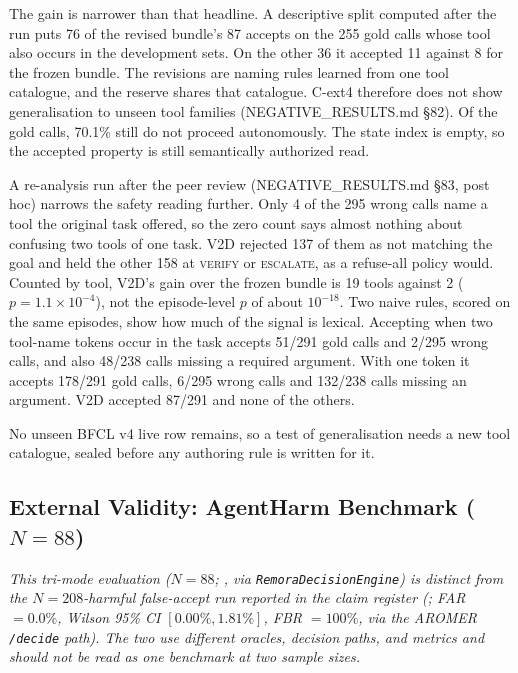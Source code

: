 \documentclass[10pt,twocolumn]{article}
\begin{document}
The gain is narrower than that headline. A descriptive split computed after
the run puts 76 of the revised bundle's 87 accepts on the 255 gold calls
whose tool also occurs in the development sets. On the other 36 it accepted
11 against 8 for the frozen bundle. The revisions are naming rules learned
from one tool catalogue, and the reserve shares that catalogue. C-ext4
therefore does not show generalisation to unseen tool families
(NEGATIVE\_RESULTS.md \S82). Of the gold calls, 70.1\% still do not proceed
autonomously. The state
index is empty, so the accepted property is still semantically authorized
read.

A re-analysis run after the peer review (NEGATIVE\_RESULTS.md \S83, post
hoc) narrows the safety reading further. Only 4 of the 295 wrong calls name
a tool the original task offered, so the zero count says almost nothing
about confusing two tools of one task. V2D rejected 137 of them as not
matching the goal and held the other 158 at \textsc{verify} or
\textsc{escalate}, as a refuse-all policy would. Counted by tool, V2D's gain
over the frozen bundle is 19 tools against 2 ($p = 1.1\times10^{-4}$), not
the episode-level $p$ of about $10^{-18}$. Two naive rules, scored on the
same episodes, show how much of the signal is lexical. Accepting when two
tool-name tokens occur in the task accepts 51/291 gold calls and 2/295 wrong
calls, and also 48/238 calls missing a required argument. With one token it
accepts 178/291 gold calls, 6/295 wrong calls and 132/238 calls missing an
argument. V2D accepted 87/291 and none of the others.

No unseen BFCL v4 live row remains, so a test of generalisation needs
a new tool catalogue, sealed before any authoring rule is written for it.

\subsection{External Validity: AgentHarm Benchmark (\texorpdfstring{$N=88$}{N=88})}
\label{sec:agentharm}

\emph{This tri-mode evaluation ($N=88$;
, via
\texttt{RemoraDecisionEngine}) is distinct from the $N=208$-harmful
false-accept run reported in the claim register
(; FAR $=0.0\%$,
Wilson 95\% CI $[0.00\%, 1.81\%]$, FBR $=100\%$, via the AROMER
\texttt{/decide} path). The two use different oracles, decision paths,
and metrics and should not be read as one benchmark at two sample
sizes.}
\end{document}
